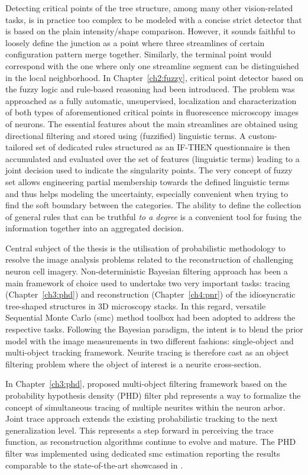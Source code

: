 Detecting critical points of the tree structure, among many other vision-related tasks, is in practice too complex to be modeled with a concise strict detector that is based on the plain intensity/shape comparison. However, it sounds faithful to loosely define the junction as a point where three streamlines of certain configuration pattern merge together. Similarly, the terminal point would correspond with the one where only one streamline segment can be distinguished in the local neighborhood. In Chapter~\ref{ch2:fuzzy}, critical point detector based on the fuzzy logic and rule-based reasoning had been introduced. The problem was approached as a fully automatic, unsupervised, localization and characterization of both types of aforementioned critical points in fluorescence microscopy images of neurons. The essential features about the main streamlines are obtained using directional filtering and stored using (fuzzified) linguistic terms. A custom-tailored set of dedicated rules structured as an IF-THEN questionnaire is then accumulated and evaluated over the set of features (linguistic terms) leading to a joint decision used to indicate the singularity points. The very concept of fuzzy set allows engineering partial membership towards the defined linguistic terms and thus helps modeling the uncertainty, especially convenient when trying to find the soft boundary between the categories. The ability to define the collection of general rules that can be truthful \textit{to a degree} is a convenient tool for fusing the information together into an aggregated decision. 

Central subject of the thesis is the utilisation of probabilistic methodology to resolve the image analysis problems related to the reconstruction of challenging neuron cell imagery. Non-deterministic Bayesian filtering approach has been a main framework of choice used to undertake two very important tasks: tracing (Chapter~\ref{ch3:phd}) and reconstruction (Chapter~\ref{ch4:pnr}) of the idiosyncratic tree-shaped structures in 3D microscopy stacks. In this regard, versatile Sequential Monte Carlo (\gls{smc}) method toolbox had been adopted to address the respective tasks. Following the Bayesian paradigm, the intent is to blend the prior model with the image measurements in two different fashions: single-object and multi-object tracking framework. Neurite tracing is therefore cast as an object filtering problem where the object of interest is a neurite cross-section. 

In Chapter~\ref{ch3:phd}, proposed multi-object filtering framework based on the probability hypothesis density (PHD) filter \gls{phd} represents a way to formalize the concept of simultaneous tracing of multiple neurites within the neuron arbor. Joint trace approach extends the existing probabilistic tracking to the next generalization level. This represents a step forward in perceiving the trace function, as reconstruction algorithms continue to evolve and mature. The PHD filter was implemented using dedicated \gls{smc} estimation \cite{ristic2010improved} reporting the results comparable to the state-of-the-art showcased in \cite{radojevic2017automated}.

